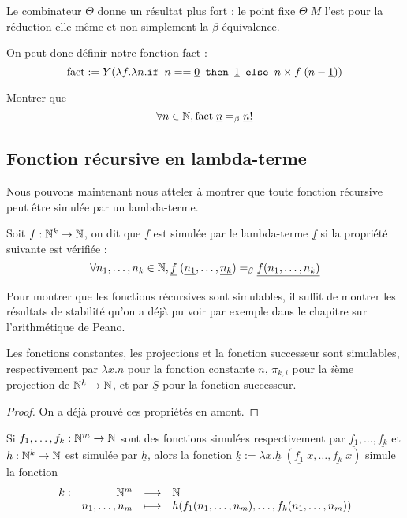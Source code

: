 \begin{rmk}
    Le combinateur $\Theta$ donne un résultat plus fort : le point fixe $\Theta\;M$ l'est pour la réduction elle-même et non simplement la $\beta$-équivalence.
\end{rmk}

On peut donc définir notre fonction fact : $$\mathrm{fact} := Y(\lambda f.\lambda n.\texttt{if } n==\underline 0 \texttt{ then } \underline 1\texttt{ else }n\times f\;(n-\underline 1))$$

\begin{exo}
    Montrer que $$\forall n\in\mathbb{N}, \mathrm{fact}\;\underline n =_\beta \underline{n!}$$
\end{exo}

\subsection{Fonction récursive en lambda-terme}

Nous pouvons maintenant nous atteler à montrer que toute fonction récursive peut être simulée par un lambda-terme.

\begin{defi}[Simulation]
    Soit $f : \mathbb{N}^k\to\mathbb{N}$, on dit que $f$ est simulée par le lambda-terme $\underline f$ si la propriété suivante est vérifiée : $$\forall n_1,\ldots,n_k\in\mathbb{N}, \underline f\;(\underline{n_1},\ldots,\underline{n_k}) =_\beta \underline{f(n_1,\ldots,n_k)}$$
\end{defi}

Pour montrer que les fonctions récursives sont simulables, il suffit de montrer les résultats de stabilité qu'on a déjà pu voir par exemple dans le chapitre sur l'arithmétique de Peano.

\begin{prop}
    Les fonctions constantes, les projections et la fonction successeur sont simulables, respectivement par $\lambda x.\underline n$ pour la fonction constante $n$, $\pi_{k,i}$ pour la $i$ème projection de $\mathbb{N}^k\to\mathbb{N}$, et par $\underline S$ pour la fonction successeur.
\end{prop}

\begin{proof}
    On a déjà prouvé ces propriétés en amont.
\end{proof}

\begin{prop}
    Si $f_1,\ldots,f_k : \mathbb{N}^m\to\mathbb{N}$ sont des fonctions simulées respectivement par $\underline{f_1},\ldots,\underline{f_k}$ et $h : \mathbb{N}^k\to\mathbb{N}$ est simulée par $\underline h$, alors la fonction $\underline k := \lambda x.\underline h\;(\underline{f_1}\;x,\ldots,\underline{f_k}\;x)$ simule la fonction $$\begin{array}[t]{lrcl} k: & \mathbb{N}^m & \longrightarrow & \mathbb{N} \\ & n_1,\ldots,n_m & \longmapsto &  h(f_1(n_1,\ldots,n_m),\ldots,f_k(n_1,\ldots,n_m)) \end{array}$$
\end{prop}

